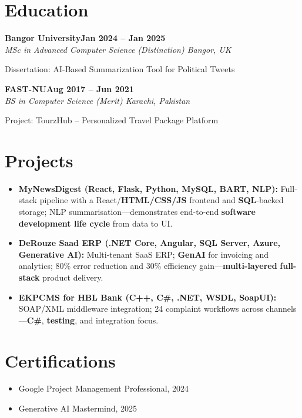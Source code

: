 \documentclass[letterpaper,10pt]{article}
\newcommand{\headingBf}[2]{
  \hspace{10pt}\textbf{#1}\hfill\textbf{#2}\\
}
\newcommand{\headingIt}[2]{
  \hspace{10pt}\textit{#1}\hfill\textit{#2}\\
}
\newenvironment{resume_list}{
  \vspace{-7pt}
  \begin{itemize}[itemsep=-2px, parsep=1pt, leftmargin=30pt]
}{
  \end{itemize}
}
\begin{document}
\section{Education}

\headingBf{Bangor University}{Jan 2024 -- Jan 2025}
\headingIt{MSc in Advanced Computer Science (Distinction) \hfill Bangor, UK}{}
\begin{resume_list}
    \item Dissertation: AI-Based Summarization Tool for Political Tweets
\end{resume_list}

\headingBf{FAST-NU}{Aug 2017 -- Jun 2021}
\headingIt{BS in Computer Science (Merit) \hfill Karachi, Pakistan}{}
\begin{resume_list}
    \item Project: TourzHub -- Personalized Travel Package Platform
\end{resume_list}

\section{Projects}
\begin{itemize}
    \setlength\itemsep{3pt}
    \item \textbf{MyNewsDigest (React, Flask, Python, MySQL, BART, NLP):} Full-stack pipeline with a React/\textbf{HTML/CSS/JS} frontend and \textbf{SQL}-backed storage; NLP summarisation---demonstrates end-to-end \textbf{software development life cycle} from data to UI.
    \item \textbf{DeRouze Saad ERP (.NET Core, Angular, SQL Server, Azure, Generative AI):} Multi-tenant SaaS ERP; \textbf{GenAI} for invoicing and analytics; 80\% error reduction and 30\% efficiency gain---\textbf{multi-layered} \textbf{full-stack} product delivery.
    \item \textbf{EKPCMS for HBL Bank (C++, C\#, .NET, WSDL, SoapUI):} SOAP/XML middleware integration; 24 complaint workflows across channels---\textbf{C\#}, \textbf{testing}, and integration focus.
\end{itemize}

\section{Certifications}
\begin{itemize}
    \item Google Project Management Professional, 2024
    \item Generative AI Mastermind, 2025
\end{itemize}

\vspace*{\fill}
\end{document}
